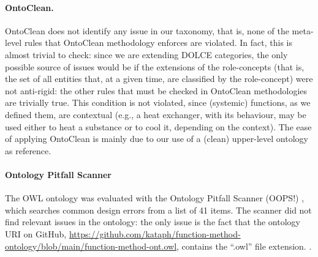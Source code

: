 \documentclass[sw]{iosart2x}
\newcommand{\DOLCE}{\textsc{DOLCE}\xspace} %
\newcommand{\OWL}{\textnormal{OWL}\xspace}
\newcommand{\qquotes}[1]{``#1''}
\newcommand{\TODO}[1]{{%
}}
\begin{document}
\paragraph{OntoClean.} OntoClean does not identify any issue in our taxonomy, that is, none of the meta-level rules that OntoClean methodology enforces are violated.
In fact, this is almost trivial to check: since we are extending \DOLCE categories, the only possible source of issues would be if the extensions of the role-concepts (that is, the set of all entities that, at a given time, are classified by the role-concept) were not anti-rigid: the other rules that must be checked in OntoClean methodologies are trivially true. 
This condition is not violated, since (systemic) functions, as we defined them, are contextual (e.g., a heat exchanger, with its behaviour, may be used either to heat a substance or to cool it, depending on the context). 
The ease of applying OntoClean is mainly due to our use of a (clean) upper-level ontology as reference. 

\paragraph{Ontology Pitfall Scanner} The \OWL ontology was evaluated with the Ontology Pitfall Scanner (OOPS!) \cite{poveda2014oops}, which searches common design errors from a list of 41 items.  
The scanner did not find relevant issues in the ontology: the only issue is the fact that the ontology URI on GitHub, \url{https://github.com/kataph/function-method-ontology/blob/main/function-method-ont.owl}, contains the \qquotes{.owl} file extension.\TODO{memo: check if true alla fine di tutto}.


\end{document}
